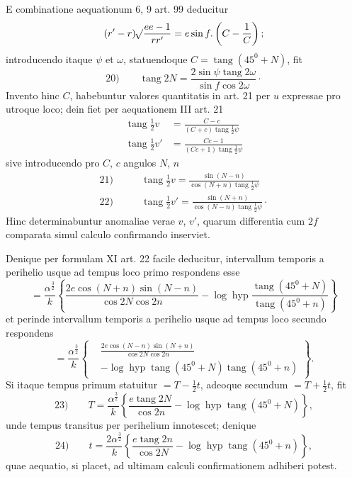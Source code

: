 \par
E combinatione aequationum 6, 9 art. 99 deducitur
\[
(r'-r)\mathord{{}^{}\!\surd}\frac{ee-1}{rr'}=e\sin f\mathpunct{.}\left(C-\frac1C\right);
\]
\noindent introducendo itaque $\psi$ et $\omega$, statuendoque $C=\operatorname{tang}(45^0+N)$, fit
\[
\mathrm{20)}\qquad\operatorname{tang}2N=\frac{2\sin\psi\operatorname{tang}2\omega}{\sin f\cos2\omega}\mathpunct{\cdot}
\]
\noindent Invento hinc $C$, habebuntur valores quantitatis in art. 21 per $u$ expressae pro utroque loco; dein fiet per aequationem III art. 21
\[
\begin{aligned}
\operatorname{tang}\tfrac12v&=\frac{C-c}{(C+c)\operatorname{tang}\tfrac12\psi}\\[.6em]
\operatorname{tang}\tfrac12v'&=\frac{Cc-1}{(Cc+1)\operatorname{tang}\tfrac12\psi}
\end{aligned}
\]
\noindent sive introducendo pro $C$, $c$ angulos $N$, $n$
\[
\begin{aligned}
\mathrm{21)}\qquad&\operatorname{tang}\tfrac12v=\frac{\sin(N-n)}{\cos(N+n)\operatorname{tang}\tfrac12\psi}\\[.6em]
\mathrm{22)}\qquad&\operatorname{tang}\tfrac12v'=\frac{\sin(N+n)}{\cos(N-n)\operatorname{tang}\tfrac12\psi}\mathpunct{\cdot}
\end{aligned}
\]
\noindent Hinc determinabuntur anomaliae verae $v$, $v'$, quarum differentia cum $2f$ comparata simul calculo confirmando inserviet.
\par
Denique per formulam XI art. 22 facile deducitur, intervallum temporis a perihelio usque ad tempus loco primo respondens esse
\[
=\frac{\alpha^{\frac32}}k\left\{\frac{2e\cos(N+n)\sin(N-n)}{\cos2N\cos2n}-\log\operatorname{hyp}\frac{\operatorname{tang}(45^0+N)}{\operatorname{tang}(45^0+n)}\right\}
\]
\noindent et perinde intervallum temporis a perihelio usque ad tempus loco secundo respondens
\[
=\frac{\alpha^{\frac32}}k\left\{\begin{aligned}&\frac{2e\cos(N-n)\sin(N+n)}{\cos2N\cos2n}\\[.5em]&-\log\operatorname{hyp}\operatorname{tang}(45^0+N)\operatorname{tang}(45^0+n)\end{aligned}\right\}.
\]
\noindent Si itaque tempus primum statuitur $=T-\tfrac12t$, adeoque secundum $=T+\tfrac12t$, fit
\[
\mathrm{23)}\qquad T=\frac{\alpha^{\frac32}}k\left\{\frac{e\operatorname{tang}2N}{\cos2n}-\log\operatorname{hyp}\operatorname{tang}(45^0+N)\right\},
\]
\noindent{}unde tempus transitus per perihelium innotescet; denique
\[
\mathrm{24)}\qquad t=\frac{2\alpha^{\frac32}}k\left\{\frac{e\operatorname{tang}2n}{\cos2N}-\log\operatorname{hyp}\operatorname{tang}(45^0+n)\right\},
\]
\noindent quae aequatio, si placet, ad ultimam calculi confirmationem adhiberi potest.
